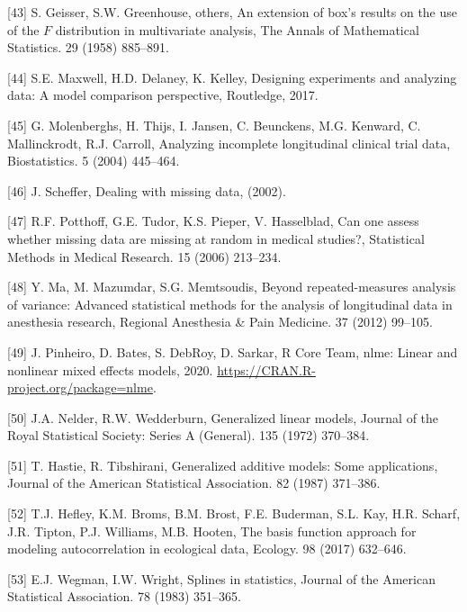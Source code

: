 \documentclass[
]{article}
\begin{document}
\leavevmode\hypertarget{ref-geisser1958}{}%
{[}43{]} S. Geisser, S.W. Greenhouse, others, An extension of box's results on the use of the \(F\) distribution in multivariate analysis, The Annals of Mathematical Statistics. 29 (1958) 885--891.

\leavevmode\hypertarget{ref-maxwell2017}{}%
{[}44{]} S.E. Maxwell, H.D. Delaney, K. Kelley, Designing experiments and analyzing data: A model comparison perspective, Routledge, 2017.

\leavevmode\hypertarget{ref-molenberghs2004}{}%
{[}45{]} G. Molenberghs, H. Thijs, I. Jansen, C. Beunckens, M.G. Kenward, C. Mallinckrodt, R.J. Carroll, Analyzing incomplete longitudinal clinical trial data, Biostatistics. 5 (2004) 445--464.

\leavevmode\hypertarget{ref-scheffer2002}{}%
{[}46{]} J. Scheffer, Dealing with missing data, (2002).

\leavevmode\hypertarget{ref-potthoff2006}{}%
{[}47{]} R.F. Potthoff, G.E. Tudor, K.S. Pieper, V. Hasselblad, Can one assess whether missing data are missing at random in medical studies?, Statistical Methods in Medical Research. 15 (2006) 213--234.

\leavevmode\hypertarget{ref-ma2012}{}%
{[}48{]} Y. Ma, M. Mazumdar, S.G. Memtsoudis, Beyond repeated-measures analysis of variance: Advanced statistical methods for the analysis of longitudinal data in anesthesia research, Regional Anesthesia \& Pain Medicine. 37 (2012) 99--105.

\leavevmode\hypertarget{ref-nlme}{}%
{[}49{]} J. Pinheiro, D. Bates, S. DebRoy, D. Sarkar, R Core Team, nlme: Linear and nonlinear mixed effects models, 2020. \url{https://CRAN.R-project.org/package=nlme}.

\leavevmode\hypertarget{ref-nelder1972}{}%
{[}50{]} J.A. Nelder, R.W. Wedderburn, Generalized linear models, Journal of the Royal Statistical Society: Series A (General). 135 (1972) 370--384.

\leavevmode\hypertarget{ref-hastie1987}{}%
{[}51{]} T. Hastie, R. Tibshirani, Generalized additive models: Some applications, Journal of the American Statistical Association. 82 (1987) 371--386.

\leavevmode\hypertarget{ref-hefley2017}{}%
{[}52{]} T.J. Hefley, K.M. Broms, B.M. Brost, F.E. Buderman, S.L. Kay, H.R. Scharf, J.R. Tipton, P.J. Williams, M.B. Hooten, The basis function approach for modeling autocorrelation in ecological data, Ecology. 98 (2017) 632--646.

\leavevmode\hypertarget{ref-wegman1983}{}%
{[}53{]} E.J. Wegman, I.W. Wright, Splines in statistics, Journal of the American Statistical Association. 78 (1983) 351--365.
\end{document}
